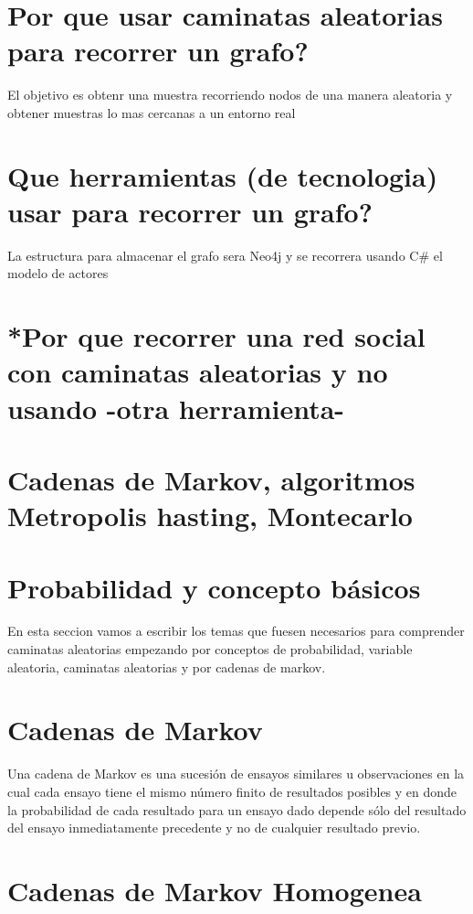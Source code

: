 \section{Por que  usar caminatas aleatorias para recorrer un grafo?}
El objetivo es  obtenr una muestra recorriendo nodos de una manera aleatoria
y obtener muestras lo mas cercanas a un entorno real
\section {Que herramientas (de tecnologia) usar para recorrer un grafo?}

La estructura para almacenar el grafo sera Neo4j  y se recorrera usando C\#  el modelo de actores
\section {*Por que recorrer una red social con caminatas aleatorias y no usando  -otra herramienta-}

\section{Cadenas de Markov, algoritmos Metropolis hasting, Montecarlo}





\section{Probabilidad y concepto b\'asicos}
En esta seccion vamos a escribir los temas que fuesen necesarios para comprender
caminatas aleatorias empezando por conceptos de probabilidad, variable aleatoria,
caminatas aleatorias y por cadenas de markov.
\section{Cadenas de Markov}



Una cadena de Markov es una sucesi\'on de ensayos similares u observaciones en la cual cada ensayo tiene el mismo n\'umero finito de resultados posibles y en donde la probabilidad de cada resultado para un ensayo dado depende s\'olo del resultado del ensayo inmediatamente precedente y no de cualquier resultado previo.


\section{Cadenas de Markov Homogenea}

